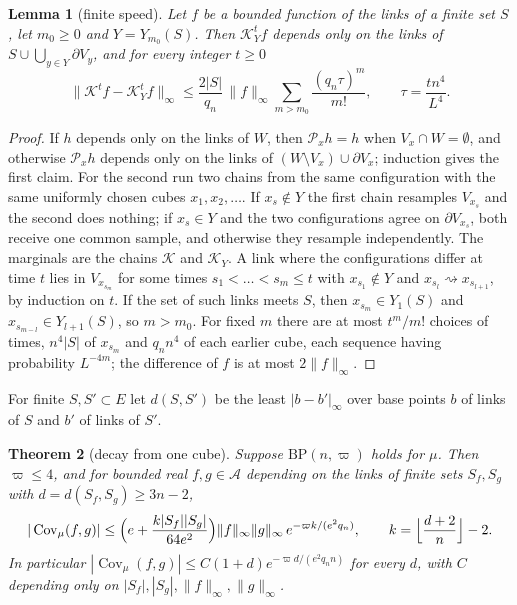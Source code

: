 \documentclass[11pt]{amsart}
\newtheorem{theorem}{Theorem}[section]
\newtheorem{lemma}[theorem]{Lemma}
\theoremstyle{definition}
\theoremstyle{remark}
\numberwithin{equation}{section}
\newcommand{\Cov}{\operatorname{Cov}}
\newcommand{\BP}{\mathrm{BP}}
\begin{document}
\begin{lemma}[finite speed]\label{lem:speed}
Let $f$ be a bounded function of the links of a finite set $S$, let $m_0\ge0$
and $Y=Y_{m_0}(S)$. Then $\mathcal K_Y^tf$ depends only on the links of
$S\cup\bigcup_{y\in Y}\partial V_y$, and for every integer $t\ge0$
\[
\bigl\|\mathcal K^tf-\mathcal K_Y^tf\bigr\|_\infty\le\frac{2|S|}{q_n}\,\|f\|_\infty
\sum_{m>m_0}\frac{(q_n\tau)^m}{m!},\qquad\tau=\frac{tn^4}{L^4}.
\]
\end{lemma}

\begin{proof}
If $h$ depends only on the links of $W$, then $\mathcal P_xh=h$ when $V_x\cap W=
\emptyset$, and otherwise $\mathcal P_xh$ depends only on the links of $(W\setminus
V_x)\cup\partial V_x$; induction gives the first claim. For the second run two
chains from the same configuration with the same uniformly chosen cubes
$x_1,x_2,\dots$. If $x_s\notin Y$ the first chain resamples $V_{x_s}$ and the
second does nothing; if $x_s\in Y$ and the two configurations agree on
$\partial V_{x_s}$, both receive one common sample, and otherwise they resample
independently. The marginals are the chains $\mathcal K$ and $\mathcal K_Y$. A
link where the configurations differ at time $t$ lies in $V_{x_{s_m}}$ for some
times $s_1<\dots<s_m\le t$ with $x_{s_1}\notin Y$ and $x_{s_l}\rightsquigarrow
x_{s_{l+1}}$, by induction on $t$. If the set of such links meets $S$, then
$x_{s_m}\in Y_1(S)$ and $x_{s_{m-l}}\in Y_{l+1}(S)$, so $m>m_0$. For fixed $m$
there are at most $t^m/m!$ choices of times, $n^4|S|$ of $x_{s_m}$ and $q_nn^4$
of each earlier cube, each sequence having probability $L^{-4m}$; the
difference of $f$ is at most $2\|f\|_\infty$.
\end{proof}

For finite $S,S'\subset E$ let $d(S,S')$ be the least $|b-b'|_\infty$ over base
points $b$ of links of $S$ and $b'$ of links of $S'$.

\begin{theorem}[decay from one cube]\label{thm:decay}
Suppose $\BP(n,\varpi)$ holds for $\mu$. Then $\varpi\le4$, and for bounded
real $f,g\in\mathcal A$ depending on the links of finite sets $S_f,S_g$ with
$d=d(S_f,S_g)\ge3n-2$,
\[
|\Cov_\mu(f,g)|\le\Bigl(e+\frac{k|S_f||S_g|}{64e^2}\Bigr)\|f\|_\infty\|g\|_\infty\,
e^{-\varpi k/(e^2q_n)},\qquad k=\Bigl\lfloor\frac{d+2}n\Bigr\rfloor-2 .
\]
In particular $|\Cov_\mu(f,g)|\le C(1+d)e^{-\varpi d/(e^2q_nn)}$ for every $d$,
with $C$ depending only on $|S_f|,|S_g|,\|f\|_\infty,\|g\|_\infty$.
\end{theorem}
\end{document}
